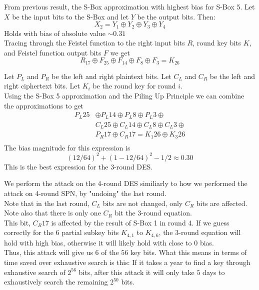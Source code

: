 \documentclass[9pt]{beamer}
\begin{document}
\begin{frame}
From previous result, the S-Box approximation with highest bias for S-Box 5. Let $X$ be the input bits to the S-Box and let $Y$ be the output bits. Then:
\[ X_{2} = Y_{1} \oplus Y_{2} \oplus Y_{3} \oplus Y_{4} \]
Holds with bias of absolute value $\sim 0.31$\\
\vspace{5mm}
Tracing through the Feistel function to the right input bits $R$, round key bits $K$, and Feistel function output bits $F$ we get
\[ R_{17} \oplus F_{25} \oplus F_{14} \oplus F_{8} \oplus F_{3} = K_{26} \]

\end{frame}

\begin{frame}
Let $P_L$ and $P_R$ be the left and right plaintext bits. Let $C_L$ and $C_R$ be the left and right ciphertext bits. Let $K_i$ be the round key for round $i$. \\
\vspace{5mm}
Using the S-Box 5 approximation and the Piling Up Principle we can combine the approximations to get
\begin{align*}
 P_L{25} & \oplus P_L{14} \oplus P_L{8} \oplus P_L{3} \oplus \\
         & C_L{25} \oplus C_L{14} \oplus C_L{8} \oplus C_L{3} \oplus \\
			& P_R{17} \oplus C_R{17} = K_1{26} \oplus K_3{26} \\
\end{align*}
The bias magnitude for this expression is
\[ (12/64)^2 + (1 - 12/64)^2 - 1/2 \approx 0.30 \]
This is the best expression for the 3-round DES.
\end{frame}

\begin{frame}
We perform the attack on the 4-round DES similiarly to how we performed the attack on 4-round SPN, by "undoing" the last round.\\
\vspace{5mm}
\pause
Note that in the last round, $C_L$ bits are not changed, only $C_R$ bits are affected. Note also that there is only one $C_R$ bit the 3-round equation.\\
\vspace{5mm}
\pause
This bit, $C_R{17}$ is affected by the result of S-Box 1 in round 4. If we guess correctly for the 6 partial subkey bits $K_{4,1}$ to $K_{4,6}$, the 3-round equation will hold with high bias, otherwise it will likely hold with close to 0 bias.\\
\vspace{5mm}
\pause
Thus, this attack will give us $6$ of the $56$ key bits. What this means in terms of time saved over exhaustive search is this: If it takes a year to find a key through exhaustive search of $2^{56}$ bits, after this attack it will only take $5$ days to exhaustively search the remaining $2^{50}$ bits.
\end{frame}
\end{document}
